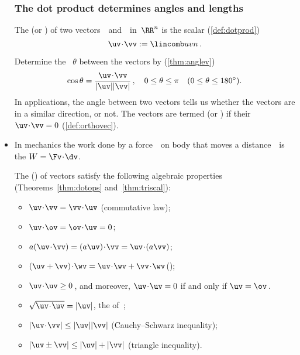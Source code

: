 \begin{itemize}
\subsubsection{The dot product determines angles and lengths}

\itemhi The  (or ) of two vectors~\uv\ and~\vv\ in~\(\RR^n\) is the scalar (\autoref{def:dotprod})
\begin{equation*}
\uv\cdot \vv:= \lincomb uvn\,.
\end{equation*}
\begin{itemize}
\itemhi  Determine the ~\(\theta\) between the vectors by (\autoref{thm:anglev})
\begin{equation*}
\cos\theta=\frac{\uv\cdot\vv}{|\uv||\vv|}\,,
\quad 0\leq\theta\leq\pi
\quad (0\leq\theta\leq180^\circ).
\end{equation*}
In applications, the angle between two vectors tells us whether the vectors are in a similar direction, or not.
\itemhi The vectors are termed  (or ) if their  \(\uv\cdot\vv=0\) (\autoref{def:orthovec}).
\end{itemize}

\item In mechanics the work done by a force~\Fv\ on body that moves a distance~\dv\ is the  \(W=\Fv\cdot\dv\).

\itemme The  () of vectors satisfy the following algebraic properties (Theorems~\ref{thm:dotops} and~\ref{thm:triscal}):
\begin{itemize}
\item \(\uv\cdot\vv=\vv\cdot\uv\) \quad({commutative law});
\item \(\uv\cdot\ov=\ov\cdot\uv=0\);
\item \(a(\uv\cdot\vv)=(a\uv)\cdot\vv=\uv\cdot(a\vv)\);
\item \((\uv+\vv)\cdot\wv=\uv\cdot\wv+\vv\cdot\wv\)\quad();
\item \(\uv\cdot\uv\geq0\)\,, and moreover, \(\uv\cdot\uv=0\) if and only if \(\uv=\ov\)\,.
\item \(\sqrt{\uv\cdot\uv}=|\uv|\), the  of~\uv;
\item \(|\uv\cdot\vv|\leq|\uv||\vv|\) ({Cauchy--Schwarz inequality});
\item \(|\uv\pm\vv|\leq|\uv|+|\vv|\) ({triangle inequality}).
\end{itemize}


\end{itemize}
